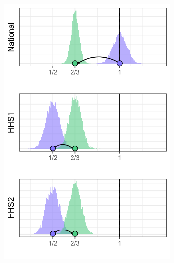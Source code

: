 \documentclass{umassthesis}          %
\begin{document}
\begin{figure}
       \begin{subfigure}{.5\textwidth}
  \centering
    \includegraphics[scale=.6]{cmse_ex2.png}
    \caption{}
\end{subfigure}%
\begin{subfigure}{.5\textwidth}
  \centering

\end{subfigure}
\end{figure}
\end{document}
